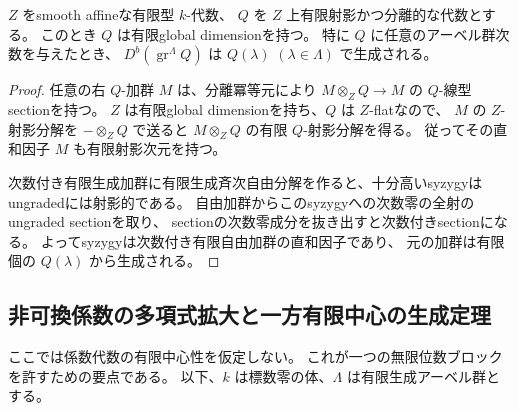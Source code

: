\begin{lemma}[分離代数と射影分解]\label{lem:separable-perfect}
 \(Z\) をsmooth affineな有限型 \(k\)-代数、
 \(Q\) を \(Z\) 上有限射影かつ分離的な代数とする。
 このとき \(Q\) は有限global dimensionを持つ。
 特に \(Q\) に任意のアーベル群次数を与えたとき、
 \(D^b(\operatorname{gr}^{\Lambda}Q)\) は \(Q(\lambda)\)
 \((\lambda\in\Lambda)\) で生成される。
\end{lemma}
\begin{proof}
 任意の右 \(Q\)-加群 \(M\) は、分離冪等元により
 \(M\otimes_ZQ\to M\) の \(Q\)-線型sectionを持つ。
 \(Z\) は有限global dimensionを持ち、\(Q\) は \(Z\)-flatなので、
 \(M\) の \(Z\)-射影分解を \(-\otimes_ZQ\) で送ると
 \(M\otimes_ZQ\) の有限 \(Q\)-射影分解を得る。
 従ってその直和因子 \(M\) も有限射影次元を持つ。

 次数付き有限生成加群に有限生成斉次自由分解を作ると、十分高いsyzygyは
 ungradedには射影的である。
 自由加群からこのsyzygyへの次数零の全射のungraded sectionを取り、
 sectionの次数零成分を抜き出すと次数付きsectionになる。
 よってsyzygyは次数付き有限自由加群の直和因子であり、
 元の加群は有限個の \(Q(\lambda)\) から生成される。
\end{proof}

\subsection{非可換係数の多項式拡大と一方有限中心の生成定理}

ここでは係数代数の有限中心性を仮定しない。
これが一つの無限位数ブロックを許すための要点である。
以下、\(k\) は標数零の体、\(\Lambda\) は有限生成アーベル群とする。

